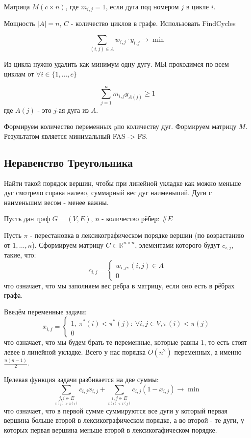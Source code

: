 \documentclass[%
10pt, %
final, %
oneside, %
onecolumn, %
centertags]{article} %
\theoremstyle{plain}
\theoremstyle{definition}
\theoremstyle{remark}
\begin{document}
Матрица $M (c\times n)$, где $m_{i,j} = 1$, если дуга под номером $j$ в цикле $i$.

Мощность $|A| = n$, $C$ - количество циклов в графе. Использовать FindCycles

$$\sum\limits_{(i,j) \in A} w_{i,j} \cdot y_{i,j} \to \min$$

Из цикла нужно удалить как минимум одну дугу. МЫ проходимся по всем циклам от $\forall i \in \{1, \ldots, c\}$

$$\sum\limits_{j=1}^n m_{i, j}y_{A(j)} \geq 1$$
где $A(j)$ - это $j$-ая дуга из $A$. 

Формируем количество переменных $y $по количеству дуг. Формируем матрицу $M$. Результатом является минимальный FAS -> FS.

\newpage
\subsection{Неравенство Треугольника}

Найти такой порядок вершин, чтобы при линейной укладке как можно меньше дуг смотрело справа налево, суммарный вес дуг наименьший. Дуги с наименьшим весом - менее важны.

Пусть дан граф $G = (V, E)$, $n$ - количество рёбер: $\#E$

Пусть $\pi$ - перестановка в лексикографическом порядке вершин (по возрастанию от $1,\ldots, n$). Сформируем матрицу \(C \in \mathbb{R}^{n \times n}\), элементами которого будут $c_{i,j}$, такие, что:
$$c_{i,j} = \begin{cases}
	w_{i,j}, (i,j) \in A\\
	0
\end{cases}$$
что означает, что мы заполняем вес ребра в матрицу, если оно есть в рёбрах графа.

Введём переменные задачи:
$$x_{i,j} = \begin{cases}
	1,\  \pi^*(i) < \pi^*(j): \  \forall i, j \in V, \pi(i) < \pi(j)\\
	0
\end{cases}$$
что означает, что мы будем брать те переменные, которые равны $1$, то есть стоят левее в линейной укладке. Всего у нас порядка $O(n^2)$ переменных, а именно $\frac{n(n-1)}{2}$.

Целевая функция задачи разбивается на две суммы:
$$\sum\limits_{\underset{\pi(j)>\pi(i)}{j,i \in E}}c_{i,j}x_{i,j} + \sum\limits_{\underset{\pi(i)<\pi(j)}{i,j \in E}}c_{i,j}(1-x_{i,j}) \to \min$$
что означает, что в первой сумме суммируются все дуги у который первая вершина больше второй в лексикографическом порядке, а во второй - те дуги, у которых первая вершина меньше второй в лексикогафическом порядке.
\end{document}

